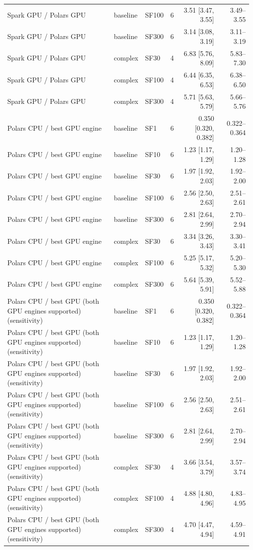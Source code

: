 \begin{tabular}{lllrrr}
Spark GPU / Polars GPU & baseline & SF100 & 6 & 3.51 [3.47, 3.55] & 3.49--3.55 \\
Spark GPU / Polars GPU & baseline & SF300 & 6 & 3.14 [3.08, 3.19] & 3.11--3.19 \\
Spark GPU / Polars GPU & complex & SF30 & 4 & 6.83 [5.76, 8.09] & 5.83--7.30 \\
Spark GPU / Polars GPU & complex & SF100 & 4 & 6.44 [6.35, 6.53] & 6.38--6.50 \\
Spark GPU / Polars GPU & complex & SF300 & 4 & 5.71 [5.63, 5.79] & 5.66--5.76 \\
Polars CPU / best GPU engine & baseline & SF1 & 6 & 0.350 [0.320, 0.382] & 0.322--0.364 \\
Polars CPU / best GPU engine & baseline & SF10 & 6 & 1.23 [1.17, 1.29] & 1.20--1.28 \\
Polars CPU / best GPU engine & baseline & SF30 & 6 & 1.97 [1.92, 2.03] & 1.92--2.00 \\
Polars CPU / best GPU engine & baseline & SF100 & 6 & 2.56 [2.50, 2.63] & 2.51--2.61 \\
Polars CPU / best GPU engine & baseline & SF300 & 6 & 2.81 [2.64, 2.99] & 2.70--2.94 \\
Polars CPU / best GPU engine & complex & SF30 & 6 & 3.34 [3.26, 3.43] & 3.30--3.41 \\
Polars CPU / best GPU engine & complex & SF100 & 6 & 5.25 [5.17, 5.32] & 5.20--5.30 \\
Polars CPU / best GPU engine & complex & SF300 & 6 & 5.64 [5.39, 5.91] & 5.52--5.88 \\
Polars CPU / best GPU (both GPU engines supported) (sensitivity) & baseline & SF1 & 6 & 0.350 [0.320, 0.382] & 0.322--0.364 \\
Polars CPU / best GPU (both GPU engines supported) (sensitivity) & baseline & SF10 & 6 & 1.23 [1.17, 1.29] & 1.20--1.28 \\
Polars CPU / best GPU (both GPU engines supported) (sensitivity) & baseline & SF30 & 6 & 1.97 [1.92, 2.03] & 1.92--2.00 \\
Polars CPU / best GPU (both GPU engines supported) (sensitivity) & baseline & SF100 & 6 & 2.56 [2.50, 2.63] & 2.51--2.61 \\
Polars CPU / best GPU (both GPU engines supported) (sensitivity) & baseline & SF300 & 6 & 2.81 [2.64, 2.99] & 2.70--2.94 \\
Polars CPU / best GPU (both GPU engines supported) (sensitivity) & complex & SF30 & 4 & 3.66 [3.54, 3.79] & 3.57--3.74 \\
Polars CPU / best GPU (both GPU engines supported) (sensitivity) & complex & SF100 & 4 & 4.88 [4.80, 4.96] & 4.83--4.95 \\
Polars CPU / best GPU (both GPU engines supported) (sensitivity) & complex & SF300 & 4 & 4.70 [4.47, 4.94] & 4.59--4.91 \\
\bottomrule
\end{tabular}
